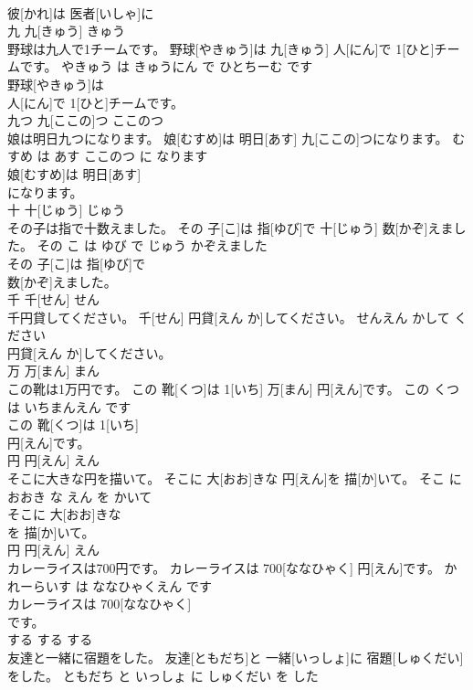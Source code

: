 \documentclass[8pt]{extreport}
\begin{document}
\begin{CJK}{UTF8}{min}
\\	彼[かれ]は 医者[いしゃ]に
\\	九	九[きゅう]	きゅう	
\\	野球は九人で1チームです。	野球[やきゅう]は 九[きゅう] 人[にん]で 1[ひと]チームです。	やきゅう は きゅうにん で ひとちーむ です	
\\	野球[やきゅう]は
\\	人[にん]で 1[ひと]チームです。			
\\	九つ	九[ここの]つ	ここのつ	
\\	娘は明日九つになります。	娘[むすめ]は 明日[あす] 九[ここの]つになります。	むすめ は あす ここのつ に なります	
\\	娘[むすめ]は 明日[あす]
\\	になります。			
\\	十	十[じゅう]	じゅう	
\\	その子は指で十数えました。	その 子[こ]は 指[ゆび]で 十[じゅう] 数[かぞ]えました。	その こ は ゆび で じゅう かぞえました	
\\	その 子[こ]は 指[ゆび]で
\\	数[かぞ]えました。			
\\	千	千[せん]	せん	
\\	千円貸してください。	千[せん] 円貸[えん か]してください。	せんえん かして ください	
\\	円貸[えん か]してください。			
\\	万	万[まん]	まん	
\\	この靴は1万円です。	この 靴[くつ]は 1[いち] 万[まん] 円[えん]です。	この くつ は いちまんえん です	
\\	この 靴[くつ]は 1[いち]
\\	円[えん]です。			
\\	円	円[えん]	えん	
\\	そこに大きな円を描いて。	そこに 大[おお]きな 円[えん]を 描[か]いて。	そこ に おおき な えん を かいて	
\\	そこに 大[おお]きな
\\	を 描[か]いて。			
\\	円	円[えん]	えん	
\\	カレーライスは700円です。	カレーライスは 700[ななひゃく] 円[えん]です。	かれーらいす は ななひゃくえん です	
\\	カレーライスは 700[ななひゃく]
\\	です。			
\\	する	する	する	
\\	友達と一緒に宿題をした。	友達[ともだち]と 一緒[いっしょ]に 宿題[しゅくだい]をした。	ともだち と いっしょ に しゅくだい を した	

\end{CJK}
\end{document}
